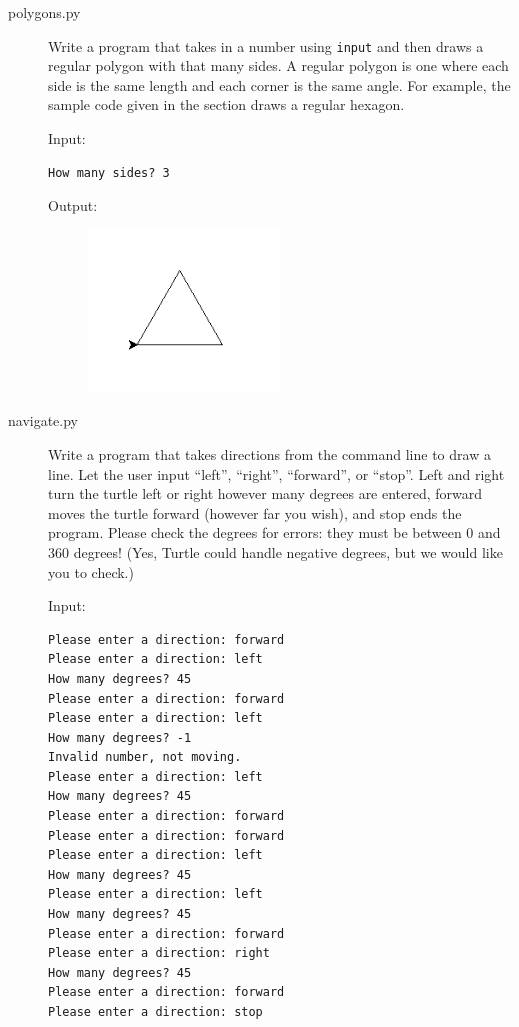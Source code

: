 \documentclass[11pt]{cselabheader}
\begin{document}
\begin{description}
  \item[polygons.py] Write a program that takes in a number using
    \lstinline{input} and then draws a regular polygon with that many sides. A
    regular polygon is one where each side is the same length and each corner is
    the same angle. For example, the sample code given in the section draws a
    regular hexagon.

    Input:
    \begin{lstlisting}[style=ipython]
How many sides? 3
    \end{lstlisting}

    Output:
    \begin{figure}[h]
      \centering
      \includegraphics[width=2.0in]{img/triangle}
    \end{figure}

  \item[navigate.py] Write a program that takes directions from the command line
    to draw a line. Let the user input ``left'', ``right'', ``forward'', or
    ``stop''. Left and right turn the turtle left or right however many degrees
    are entered, forward moves the turtle forward (however far you wish), and
    stop ends the program. Please check the degrees for errors: they must be
    between 0 and 360 degrees! (Yes, Turtle could handle negative degrees, but
    we would like you to check.)

    Input:
  \begin{lstlisting}[style=bash]
Please enter a direction: forward
Please enter a direction: left
How many degrees? 45
Please enter a direction: forward
Please enter a direction: left
How many degrees? -1
Invalid number, not moving.
Please enter a direction: left
How many degrees? 45
Please enter a direction: forward
Please enter a direction: forward
Please enter a direction: left
How many degrees? 45
Please enter a direction: left
How many degrees? 45
Please enter a direction: forward
Please enter a direction: right
How many degrees? 45
Please enter a direction: forward
Please enter a direction: stop
  \end{lstlisting}


\end{description}
\end{document}
